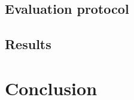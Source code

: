 \documentclass[conference]{IEEEtran}
\begin{document}
\subsection*{Evaluation protocol}

\subsection*{Results}



\section*{Conclusion}


\nocite{*}


\end{document}
